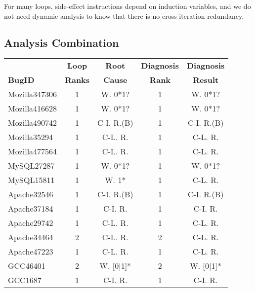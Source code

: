 For many loops, side-effect instructions depend on induction variables, 
and we do not need dynamic analysis to know that there is no cross-iteration redundancy.   


\subsection{Analysis Combination}

\begin{table}
  \centering
  \small
  \newcommand{\Yes}[1]{\checkmark{}$_#1$}
  \newcommand{\No}[0]{-}
  \begin{tabular}{lcccc}
    \toprule
                    &{\bf Loop }   & {\bf Root}   & {\bf Diagnosis} & {\bf Diagnosis} \\
   {\bf BugID}      & {\bf Ranks}    & {\bf Cause}  & {\bf Rank }    & {\bf Result }   \\
   \midrule
   Mozilla347306    & 1            &  W. 0*1?     & 1             &  W. 0*1? \\
   Mozilla416628    & 1            &  W. 0*1?     & 1             &  W. 0*1?\\
   Mozilla490742    & 1            &  C-I. R.(B)  & 1             &  C-I. R.(B)\\
   Mozilla35294     & 1            &  C-L. R.     & 1             &  C-L. R.   \\ 
   Mozilla477564    & 1            &  C-L. R.     & 1             &  C-L. R.   \\
   \midrule 
   MySQL27287       & 1            &  W. 0*1?     & 1             &  W. 0*1? \\
   MySQL15811       & 1            &  W. 1*       & 1             &  C-L. R.\\ 
   \midrule    
   Apache32546      & 1            &  C-I. R.(B)  & 1             &  C-I. R.(B)\\
   Apache37184      & 1            &  C-I. R.     & 1             &  C-I. R.\\
   Apache29742      & 1            &  C-L. R.     & 1            &  C-L. R. \\ 
   Apache34464      & 2            &  C-L. R.     & 2            &  C-L. R.\\
   Apache47223      & 1            &  C-L. R.     & 1            &  C-L. R.\\
   \midrule
   GCC46401         & 2              &  W. [0$|$1]* & 2              &  W. [0$|$1]*  \\
   GCC1687          & 1              &  C-I. R.    & 1              &  C-I. R.\\

\end{tabular}
\end{table}
